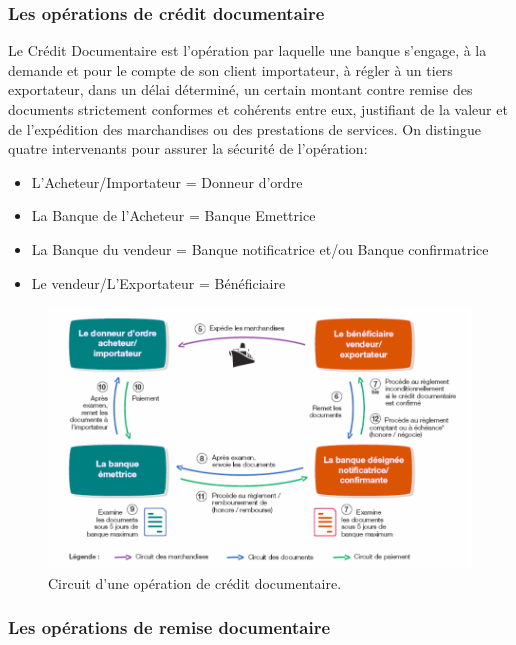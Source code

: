  \subsubsection{Les opérations de crédit documentaire}
   Le Crédit Documentaire est l’opération par laquelle une banque s’engage, à la
   demande et pour le compte de son client importateur, à régler à un tiers 
   exportateur, dans un délai déterminé, un certain montant contre remise des 
   documents strictement conformes et cohérents entre eux, justifiant de la 
   valeur et de l’expédition des marchandises ou des prestations de services.
   On distingue quatre intervenants pour assurer la sécurité de l'opération:
   \begin{itemize}
     \item L'Acheteur/Importateur = Donneur d'ordre
     \item La Banque de l'Acheteur = Banque Emettrice
     \item La Banque du vendeur = Banque notificatrice et/ou Banque confirmatrice
     \item Le vendeur/L'Exportateur = Bénéficiaire
   \end{itemize}
   \begin{figure}[h!]
     \begin{center}
       \includegraphics[width=12cm]{images/credit_doc.png}
        \caption{Circuit d'une opération de crédit documentaire.
        \label{fig:credit}}
     \end{center}
   \end{figure}
   
 \subsubsection{Les opérations de remise documentaire}
 
